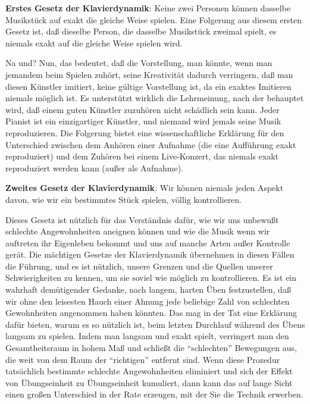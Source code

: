 \textbf{Erstes Gesetz der Klavierdynamik}: Keine zwei Personen können dasselbe Musikstück auf exakt die gleiche Weise spielen.
Eine Folgerung aus diesem ersten Gesetz ist, daß dieselbe Person, die dasselbe Musikstück zweimal spielt, es niemals exakt auf die gleiche Weise spielen wird.

Na und? Nun, das bedeutet, daß die Vorstellung, man könnte, wenn man jemandem beim Spielen zuhört, seine Kreativität dadurch verringern, daß man diesen Künstler imitiert, keine gültige Vorstellung ist, da ein exaktes Imitieren niemals möglich ist.
Es unterstützt wirklich die Lehrmeinung, nach der behauptet wird, daß einem guten Künstler zuzuhören nicht schädlich sein kann.
Jeder Pianist ist ein einzigartiger Künstler, und niemand wird jemals seine Musik reproduzieren.
Die Folgerung bietet eine wissenschaftliche Erklärung für den Unterschied zwischen dem Anhören einer Aufnahme (die eine Aufführung exakt reproduziert) und dem Zuhören bei einem Live-Konzert, das niemals exakt reproduziert werden kann (außer als Aufnahme).

\textbf{Zweites Gesetz der Klavierdynamik}: Wir können niemals jeden Aspekt davon, wie wir ein bestimmtes Stück spielen, völlig kontrollieren.

Dieses Gesetz ist nützlich für das Verständnis dafür, wie wir uns unbewußt schlechte Angewohnheiten aneignen können und wie die Musik wenn wir auftreten ihr Eigenleben bekommt und uns auf manche Arten außer Kontrolle gerät.
Die mächtigen Gesetze der Klavierdynamik übernehmen in diesen Fällen die Führung, und es ist nützlich, unsere Grenzen und die Quellen unserer Schwierigkeiten zu kennen, um sie soviel wie möglich zu kontrollieren.
Es ist ein wahrhaft demütigender Gedanke, nach langem, harten Üben festzustellen, daß wir ohne den leisesten Hauch einer Ahnung jede beliebige Zahl von schlechten Gewohnheiten angenommen haben könnten.
Das mag in der Tat eine Erklärung dafür bieten, warum es so nützlich ist, beim letzten Durchlauf während des Übens langsam zu spielen.
Indem man langsam und exakt spielt, verringert man den Gesamtheitsraum in hohem Maß und schließt die \enquote{schlechten} Bewegungen aus, die weit von dem Raum der \enquote{richtigen} entfernt sind.
Wenn diese Prozedur tatsächlich bestimmte schlechte Angewohnheiten eliminiert und sich der Effekt von Übungseinheit zu Übungseinheit kumuliert, dann kann das auf lange Sicht einen großen Unterschied in der Rate erzeugen, mit der Sie die Technik erwerben.




